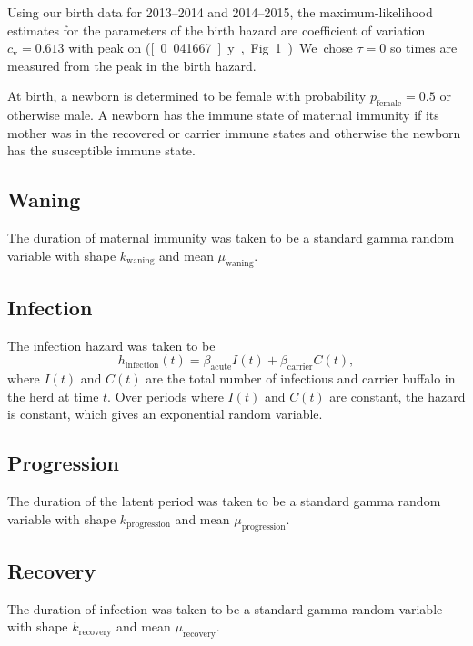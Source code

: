 \documentclass[12pt, UKenglish]{article}  %
\begin{document}
Using our birth data for 2013–2014 and 2014–2015, the
maximum-likelihood estimates for the parameters of the birth hazard
are coefficient of variation $c_{\mathrm{v}} = 0.613$ with peak on
{\printyearoff{}} (\unit[0.041667]{y}, Fig.~1). We
chose $\tau = 0$ so times are measured from the peak in the birth
hazard.

At birth, a newborn is determined to be female with probability
$p_{\text{female}} = 0.5$ or otherwise male. A newborn has the immune
state of maternal immunity if its mother was in the recovered or
carrier immune states and otherwise the newborn has the susceptible
immune state.


\subsection{Waning}

The duration of maternal immunity was taken to be a standard gamma
random variable with shape $k_{\text{waning}}$
and mean $\mu_{\text{waning}}$.


\subsection{Infection}

The infection hazard was taken to be
\begin{equation}
  h_{\text{infection}}(t) = \beta_{\text{acute}} I(t) +
  \beta_{\text{carrier}} C(t),
\end{equation}
where $I(t)$ and $C(t)$ are the total number of infectious and carrier
buffalo in the herd at time $t$.  Over periods where $I(t)$ and $C(t)$
are constant, the hazard is constant, which gives an exponential
random variable.


\subsection{Progression}

The duration of the latent period was taken to be a standard gamma
random variable with shape $k_{\text{progression}}$
and mean $\mu_{\text{progression}}$.


\subsection{Recovery}

The duration of infection was taken to be a standard gamma random
variable with shape $k_{\text{recovery}}$ and mean
$\mu_{\text{recovery}}$.
\end{document}
